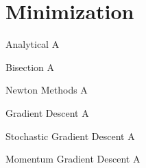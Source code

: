   \section{Minimization}
  \begin{frame}{Analytical}
    A
  \end{frame}

  \begin{frame}{Bisection}
    A
  \end{frame}

  \begin{frame}{Newton Methods}
    A
  \end{frame}

  \begin{frame}{Gradient Descent}
    A
  \end{frame}

  \begin{frame}{Stochastic Gradient Descent}
    A
  \end{frame}

  \begin{frame}{Momentum Gradient Descent}
    A
  \end{frame}


